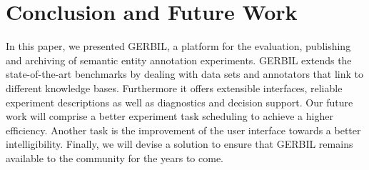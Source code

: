 

\section{Conclusion and Future Work}
\label{cha334:sec:conclusion}
In this paper, we presented GERBIL, a platform for the evaluation, publishing and archiving of semantic entity annotation experiments.
GERBIL extends the state-of-the-art benchmarks by dealing with data sets and annotators that link to different knowledge bases. 
Furthermore it offers extensible interfaces, reliable experiment descriptions as well as diagnostics and decision support.
Our future work will comprise a better experiment task scheduling to achieve a higher efficiency. 
Another task is the improvement of the user interface towards a better intelligibility.
Finally, we will devise a solution to ensure that GERBIL remains available to the community for the years to come.


%
%


%